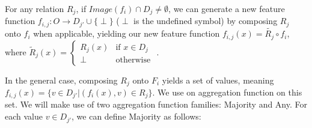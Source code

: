 \documentclass{article}
\theoremstyle{definition}
\begin{document}
For any relation $R_j$, if $Image(f_i) \cap D_j \neq\emptyset$, we can generate a new feature function $f_{i,j}:O\rightarrow D_{j'}\cup\{\perp\}$ ($\perp$ is the undefined symbol) by composing $R_j$ onto $f_i$ when applicable, yielding our new feature function  $f_{i,j}(x)=\tilde{R_j}\circ f_i$, where $\tilde{R}_j(x)=\begin{cases} R_j(x) &\mbox{if } x\in D_j\\ 
\perp & \mbox{otherwise } \end{cases}$.


In the general case, composing $R_j$ onto $F_i$ yields a set of values, meaning $f_{i,j}(x)=\{v\in D_{j'}|(f_i(x),v)\in R_j\}$. 
We use on aggregation function on this set.
We will make use of two aggregation function families: Majority and Any.
For each value $v\in D_{j'}$, we can define Majority as follows:
 
\end{document}
